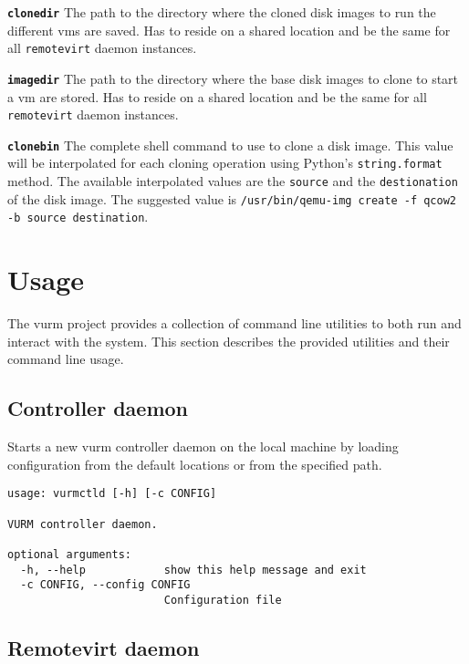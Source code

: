 \textbf{\texttt{clonedir}} The path to the directory where the cloned disk images to run the different \glspl{vm} are saved. Has to reside on a shared location and be the same for all \texttt{remotevirt} daemon instances.

\textbf{\texttt{imagedir}} The path to the directory where the base disk images to clone to start a \gls{vm} are stored. Has to reside on a shared location and be the same for all \texttt{remotevirt} daemon instances.

\textbf{\texttt{clonebin}} The complete shell command to use to clone a disk image. This value will be interpolated for each cloning operation using Python's \texttt{string.format} method. The available interpolated values are the \texttt{source} and the \texttt{destionation} of the disk image. The suggested value is \texttt{/usr/bin/qemu-img create -f qcow2 -b {source} {destination}}.


\section{Usage}

The \gls{vurm} project provides a collection of command line utilities to both run and interact with the system. This section describes the provided utilities and their command line usage.

\subsection{Controller daemon}

Starts a new \gls{vurm} controller daemon on the local machine by loading configuration from the default locations or from the specified path.

\begin{lstlisting}
usage: vurmctld [-h] [-c CONFIG]

VURM controller daemon.

optional arguments:
  -h, --help            show this help message and exit
  -c CONFIG, --config CONFIG
                        Configuration file
\end{lstlisting}


\subsection{Remotevirt daemon}

